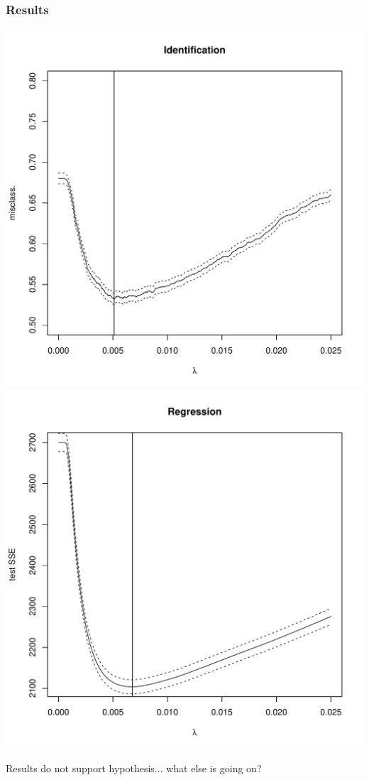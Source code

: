 \documentclass{beamer}
\begin{document}
\begin{frame}
\frametitle{Results}
\begin{center}
\includegraphics[scale = 0.35]{exp1_1.pdf}
\includegraphics[scale = 0.35]{exp1_2.pdf}
\end{center}
Results do not support hypothesis... what else is going on?
\end{frame}
\end{document}
